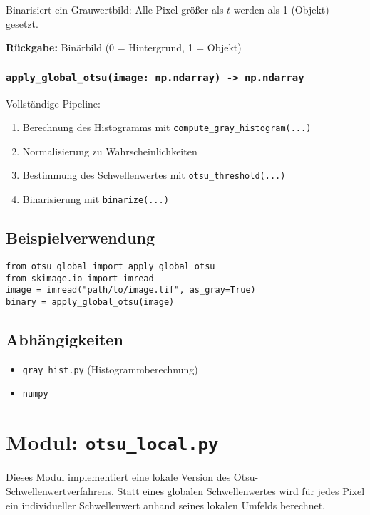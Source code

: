 \documentclass[a4paper,12pt]{article}
\begin{document}
Binarisiert ein Grauwertbild: Alle Pixel größer als $t$ werden als 1 (Objekt) gesetzt.

\textbf{Rückgabe:} Binärbild (0 = Hintergrund, 1 = Objekt)

\subsubsection*{\texttt{apply\_global\_otsu(image: np.ndarray) -> np.ndarray}}

Vollständige Pipeline:
\begin{enumerate}
  \item Berechnung des Histogramms mit \texttt{compute\_gray\_histogram(...)}
  \item Normalisierung zu Wahrscheinlichkeiten
  \item Bestimmung des Schwellenwertes mit \texttt{otsu\_threshold(...)}
  \item Binarisierung mit \texttt{binarize(...)}
\end{enumerate}

\subsection*{Beispielverwendung}

\begin{verbatim}
from otsu_global import apply_global_otsu
from skimage.io import imread
image = imread("path/to/image.tif", as_gray=True)
binary = apply_global_otsu(image)
\end{verbatim}

\subsection*{Abhängigkeiten}
\begin{itemize}
  \item \texttt{gray\_hist.py} (Histogrammberechnung)
  \item \texttt{numpy}
\end{itemize}

\section{Modul: \texttt{otsu\_local.py}}

Dieses Modul implementiert eine lokale Version des Otsu-Schwellenwertverfahrens. Statt eines globalen Schwellenwertes wird für jedes Pixel ein individueller Schwellenwert anhand seines lokalen Umfelds berechnet.
\end{document}
